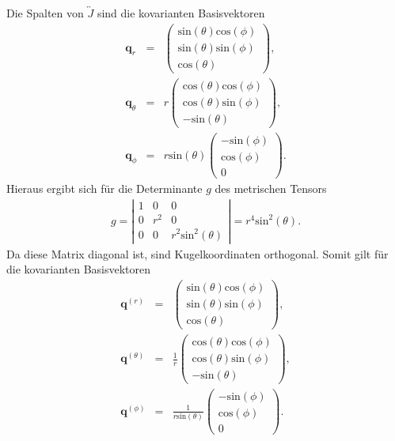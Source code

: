 \documentclass{book}
\renewcommand{\sin}{\text{sin}}
\renewcommand{\cos}{\text{cos}}
\begin{document}
%
Die Spalten von $\overleftrightarrow{J}$ sind die kovarianten Basisvektoren
%
\begin{eqnarray}
\mathbf{q}_r & = & \left(\begin{array}{c}
\sin\left(\theta\right)\cos\left(\phi\right)\\
\sin\left(\theta\right)\sin\left(\phi\right)\\
\cos\left(\theta\right)
\end{array}\right),\\
\mathbf{q}_\theta & = & r\left(\begin{array}{c}
\cos\left(\theta\right)\cos\left(\phi\right)\\
\cos\left(\theta\right)\sin\left(\phi\right)\\
-\sin\left(\theta\right)
\end{array}\right),\\
\mathbf{q}_\phi & = & r\sin\left(\theta\right)\left(\begin{array}{c}
-\sin\left(\phi\right)\\
\cos\left(\phi\right)\\
0
\end{array}\right).
\end{eqnarray}
%
Hieraus ergibt sich für die Determinante $g$ des metrischen Tensors
%
\begin{eqnarray}
g = \left|\begin{array}{ccc}
1 & 0 & 0 \\
0 & r^2 & 0 \\
0 & 0 & r^2\sin^2\left(\theta\right)
\end{array}\right| = r^4\sin^2\left(\theta\right).
\end{eqnarray}
%
Da diese Matrix diagonal ist, sind Kugelkoordinaten orthogonal.  Somit gilt für die kovarianten Basisvektoren
%
\begin{eqnarray}
\mathbf{q}^{(r)} & = & \left(\begin{array}{c}
\sin\left(\theta\right)\cos\left(\phi\right)\\
\sin\left(\theta\right)\sin\left(\phi\right)\\
\cos\left(\theta\right)
\end{array}\right),\\
\mathbf{q}^{(\theta)} & = & \frac{1}{r}\left(\begin{array}{c}
\cos\left(\theta\right)\cos\left(\phi\right)\\
\cos\left(\theta\right)\sin\left(\phi\right)\\
-\sin\left(\theta\right)
\end{array}\right),\\
\mathbf{q}^{(\phi)} & = & \frac{1}{r\sin\left(\theta\right)}\left(\begin{array}{c}
-\sin\left(\phi\right)\\
\cos\left(\phi\right)\\
0
\end{array}\right).
\end{eqnarray}
\end{document}
